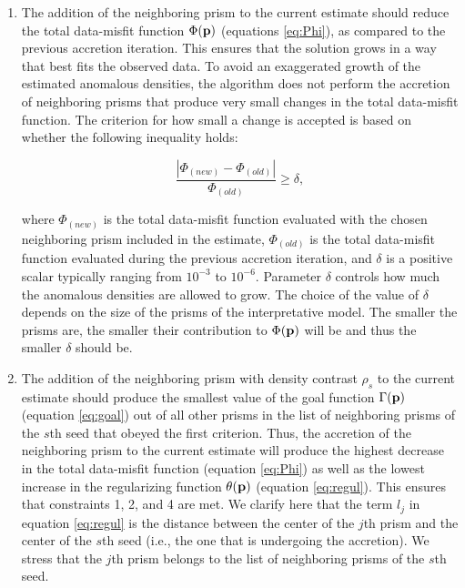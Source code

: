 \begin{enumerate}
    \item The addition of the neighboring prism to the current estimate should
    reduce the total data-misfit function
    $\Phi(\mathbf{p})$ (equations \ref{eq:Phi}), as compared
    to the previous accretion iteration.
    This ensures that the solution grows in a way that best fits the observed
    data.
    To avoid an exaggerated growth of the estimated anomalous densities, the
    algorithm does not perform the accretion of neighboring prisms that produce
    very small changes in the total data-misfit function.
    The criterion for how small a change is accepted is based on whether the
    following inequality holds:

    \begin{equation}
    \frac{|\Phi_{(new)} - \Phi_{(old)}|}{\Phi_{(old)}} \ge \delta,
    \label{eq:delta}
    \end{equation}

    where $\Phi_{(new)}$ is the total data-misfit function
    evaluated with the chosen neighboring prism included in the estimate,
    $\Phi_{(old)}$ is the total data-misfit
    function evaluated during the previous accretion iteration, and $\delta$ is
    a positive scalar typically ranging from $10^{-3}$ to $10^{-6}$.
    Parameter $\delta$ controls how much the anomalous densities are allowed to
    grow.
    The choice of the value of $\delta$ depends on the size of the prisms of the
    interpretative model.
    The smaller the prisms are, the smaller their contribution to
    $\Phi(\mathbf{p})$ will be and thus the smaller $\delta$ should be.

    \item The addition of the neighboring prism with density contrast $\rho_s$
    to the current estimate should produce the smallest value of the goal
    function $\Gamma(\mathbf{p})$ (equation \ref{eq:goal}) out of
    all other
    prisms in the list of neighboring prisms of the
    $s$th seed that obeyed the first criterion.
    Thus, the accretion of the neighboring prism to the current estimate will
    produce the highest decrease in the total data-misfit function
    (equation \ref{eq:Phi}) as well as
    the lowest increase in the regularizing function $\theta(\mathbf{p})$
    (equation \ref{eq:regul}).
    This ensures that constraints 1, 2, and 4 are met.
    We clarify here that the term $l_j$ in equation \ref{eq:regul} is
    the distance between the
    center of the $j$th prism and the center of the $s$th seed (i.e., the
    one that is undergoing the accretion).
    We stress that the $j$th prism belongs to the list of neighboring
    prisms of the $s$th seed.
\end{enumerate}

